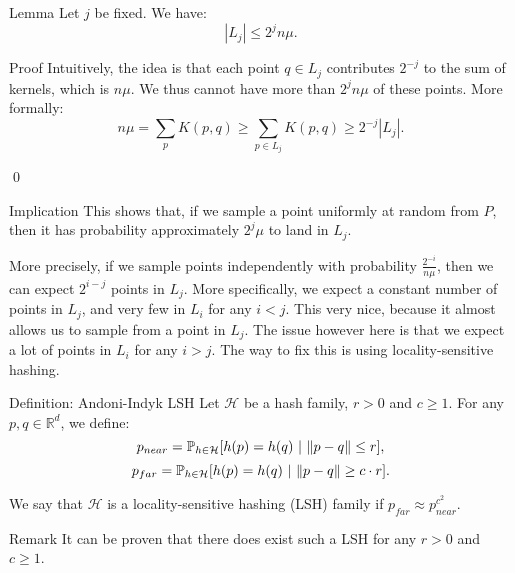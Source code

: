 \documentclass[a4paper]{article}
\begin{document}
\begin{parag}{Lemma}
    Let $j$ be fixed. We have: 
    \[\left|L_j\right| \leq 2^j n \mu.\]

    \begin{subparag}{Proof}
        Intuitively, the idea is that each point $q \in L_j$ contributes $2^{-j}$ to the sum of kernels, which is $n \mu$. We thus cannot have more than $2^j n \mu$ of these points. More formally:
        \[n\mu = \sum_{p} K\left(p, q\right) \geq \sum_{p \in L_j} K\left(p, q\right) \geq 2^{-j} \left|L_j\right|.\]

        \qed
    \end{subparag}

    \begin{subparag}{Implication}
        This shows that, if we sample a point uniformly at random from $P$, then it has probability approximately $2^j \mu$ to land in $L_j$.

        More precisely, if we sample points independently with probability $\frac{2^{-i}}{n \mu}$, then we can expect $2^{i - j}$ points in $L_j$. More specifically, we expect a constant number of points in $L_j$, and very few in $L_i$ for any $i < j$. This very nice, because it almost allows us to sample from a point in $L_j$. The issue however here is that we expect a lot of points in $L_i$ for any $i > j$. The way to fix this is using locality-sensitive hashing.
    \end{subparag}
\end{parag}

\begin{parag}{Definition: Andoni-Indyk LSH}
    Let $\mathcal{H}$ be a hash family, $r > 0$ and $c \geq 1$. For any $p, q \in \mathbb{R}^d$, we define:
    \[p_{near} = \prob_{h \in \mathcal{H}}\left[h\left(p\right) = h\left(q\right) \suchthat \left\|p - q\right\| \leq r\right],\]
    \[p_{far} = \prob_{h \in \mathcal{H}}\left[h\left(p\right) = h\left(q\right) \suchthat \left\|p - q\right\| \geq c\cdot r\right].\]

    We say that $\mathcal{H}$ is a  locality-sensitive hashing (LSH) family if $p_{far} \approx p_{near}^{c^2}$.

    \begin{subparag}{Remark}
        It can be proven that there does exist such a LSH for any $r > 0$ and $c \geq 1$.
    \end{subparag}
\end{parag}
\end{document}
